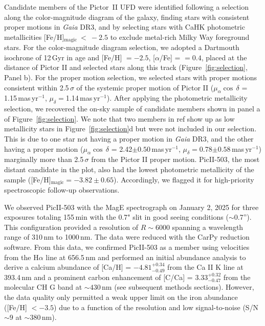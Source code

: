 \documentclass[pdflatex,sn-nature]{sn-jnl}%
\theoremstyle{thmstyleone}%
\theoremstyle{thmstyletwo}%
\theoremstyle{thmstylethree}%
\begin{document}
Candidate members of the Pictor~II UFD were identified following a selection along the color-magnitude diagram of the galaxy, finding stars with consistent proper motions in \textit{Gaia} DR3\cite{gaia2,gaiaastrometry}, and by selecting stars with CaHK photometric metallicities [Fe/H]$_{\text{magic}}~<~-2.5$ to exclude metal-rich Milky Way foreground stars.
For the color-magnitude diagram selection, we adopted a Dartmouth isochrone of 12\,Gyr in age and [Fe/H] $= -2.5$, [$\alpha$/Fe] = $= 0.4$\cite{dcj+08}, placed at the distance of Pictor II\cite{dba+16} and selected stars along this track (Figure~\ref{fig:selection}, Panel b). 
For the proper motion selection, we selected stars with proper motions consistent within 2.5\,$\sigma$ of the systemic proper motion of Pictor II ($\mu_{\alpha}\cos\,\delta$ = 1.15\,mas\,yr$^{-1}$, $\mu_{\delta} = $1.14\,mas\,yr$^{-1}$)\cite{btt+22, pel+22}.
After applying the photometric metallicity selection, we recovered the on-sky sample of candidate members shown in panel a of Figure~\ref{fig:selection}. 
We note that two members in ref\cite{pace+25} show up as low metallicity stars in Figure~\ref{fig:selection}d but were not included in our selection. 
This is due to one star not having a proper motion in \textit{Gaia} DR3, and the other having a proper motion ($\mu_{\alpha}\cos\,\delta$ = 2.42$\pm0.50$\,mas\,yr$^{-1}$, $\mu_{\delta} = $0.78$\pm0.58$\,mas\,yr$^{-1}$) marginally more than 2.5\,$\sigma$ from the Pictor II proper motion.
PicII-503, the most distant candidate in the plot, also had the lowest photometric metallicity of the sample ([Fe/H]$_{\text{magic}} = -3.82\pm0.65$). 
Accordingly, we flagged it for high-priority spectroscopic follow-up observations.

We observed PicII-503 with the MagE spectrograph on January 2, 2025 for three exposures totaling 155\,min with the 0.7" slit in good seeing conditions ($\sim$0.7''). 
This configuration provided a resolution of $R\sim6000$ spanning a wavelength range of 310\,nm to 1000\,nm. 
The data were reduced with the CarPy reduction software\cite{k+03}.
From this data, we confirmed PicII-503 as a member using velocities from the H$\alpha$ line at 656.5\,nm and performed an initial abundance analysis to derive a calcium abundance of [Ca/H] = $-4.81^{+0.34}_{-0.49}$ from the Ca II K line at 393.4\,nm and a prominent carbon enhancement of [C/Ca] = $3.33^{+0.32}_{-0.47}$ from the molecular CH G band at $\sim430$\,nm (see subsequent methods sections).
However, the data quality only permitted a weak upper limit on the iron abundance ([Fe/H] $< -3.5$) due to a function of the resolution and low signal-to-noise (S/N$\sim9$ at $\sim380$\,nm).
\end{document}
